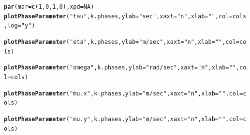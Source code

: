 \documentclass[10pt]{article}\usepackage[]{graphicx}\usepackage[]{color}
\makeatletter
\newcommand{\hlnum}[1]{\textcolor[rgb]{0.686,0.059,0.569}{#1}}%
\newcommand{\hlstr}[1]{\textcolor[rgb]{0.192,0.494,0.8}{#1}}%
\newcommand{\hlstd}[1]{\textcolor[rgb]{0.345,0.345,0.345}{#1}}%
\newcommand{\hlkwc}[1]{\textcolor[rgb]{0.333,0.667,0.333}{#1}}%
\newcommand{\hlkwd}[1]{\textcolor[rgb]{0.737,0.353,0.396}{\textbf{#1}}}%
\newenvironment{kframe}{%
 \def\at@end@of@kframe{}%
 \ifinner\ifhmode%
  \def\at@end@of@kframe{\end{minipage}}%
  \begin{minipage}{\columnwidth}%
 \fi\fi%
 \def\FrameCommand##1{\hskip\@totalleftmargin \hskip-\fboxsep
 \colorbox{shadecolor}{##1}\hskip-\fboxsep
     \hskip-\linewidth \hskip-\@totalleftmargin \hskip\columnwidth}%
 \MakeFramed {\advance\hsize-\width
   \@totalleftmargin\z@ \linewidth\hsize
   \@setminipage}}%
 {\par\unskip\endMakeFramed%
 \at@end@of@kframe}
\newenvironment{knitrout}{}{} %
\makeatother
\begin{document}
\begin{knitrout}
\begin{kframe}
{\ttfamily\noindent\bfseries{}}\begin{alltt}
\hlkwd{par}\hlstd{(}\hlkwc{mar}\hlstd{=}\hlkwd{c}\hlstd{(}\hlnum{1}\hlstd{,}\hlnum{0}\hlstd{,}\hlnum{1}\hlstd{,}\hlnum{0}\hlstd{),} \hlkwc{xpd}\hlstd{=}\hlnum{NA}\hlstd{)}
\hlkwd{plotPhaseParameter}\hlstd{(}\hlstr{"tau"}\hlstd{, k.phases,} \hlkwc{ylab}\hlstd{=}\hlstr{"sec"}\hlstd{,} \hlkwc{xaxt}\hlstd{=}\hlstr{"n"}\hlstd{,} \hlkwc{xlab}\hlstd{=}\hlstr{""}\hlstd{,} \hlkwc{col}\hlstd{=cols,} \hlkwc{log}\hlstd{=}\hlstr{"y"}\hlstd{)}
\end{alltt}


{\ttfamily\noindent\bfseries{}}\begin{alltt}
\hlkwd{plotPhaseParameter}\hlstd{(}\hlstr{"eta"}\hlstd{, k.phases,}  \hlkwc{ylab}\hlstd{=}\hlstr{"m / sec"}\hlstd{,} \hlkwc{xaxt}\hlstd{=}\hlstr{"n"}\hlstd{,} \hlkwc{xlab}\hlstd{=}\hlstr{""}\hlstd{,}  \hlkwc{col}\hlstd{=cols)}
\end{alltt}


{\ttfamily\noindent\bfseries{}}\begin{alltt}
\hlkwd{plotPhaseParameter}\hlstd{(}\hlstr{"omega"}\hlstd{, k.phases,}  \hlkwc{ylab}\hlstd{=}\hlstr{"rad / sec"}\hlstd{,} \hlkwc{xaxt}\hlstd{=}\hlstr{"n"}\hlstd{,} \hlkwc{xlab}\hlstd{=}\hlstr{""}\hlstd{,} \hlkwc{col}\hlstd{=cols)}
\end{alltt}


{\ttfamily\noindent\bfseries{}}\begin{alltt}
\hlkwd{plotPhaseParameter}\hlstd{(}\hlstr{"mu.x"}\hlstd{, k.phases,}  \hlkwc{ylab}\hlstd{=}\hlstr{"m / sec"}\hlstd{,} \hlkwc{xaxt}\hlstd{=}\hlstr{"n"}\hlstd{,} \hlkwc{xlab}\hlstd{=}\hlstr{""}\hlstd{,} \hlkwc{col}\hlstd{=cols)}
\end{alltt}


{\ttfamily\noindent\bfseries{}}\begin{alltt}
\hlkwd{plotPhaseParameter}\hlstd{(}\hlstr{"mu.y"}\hlstd{, k.phases,}  \hlkwc{ylab}\hlstd{=}\hlstr{"m / sec"}\hlstd{,} \hlkwc{xaxt}\hlstd{=}\hlstr{"n"}\hlstd{,} \hlkwc{xlab}\hlstd{=}\hlstr{""}\hlstd{,} \hlkwc{col}\hlstd{=cols)}
\end{alltt}



\end{kframe}
\end{knitrout}
\end{document}

